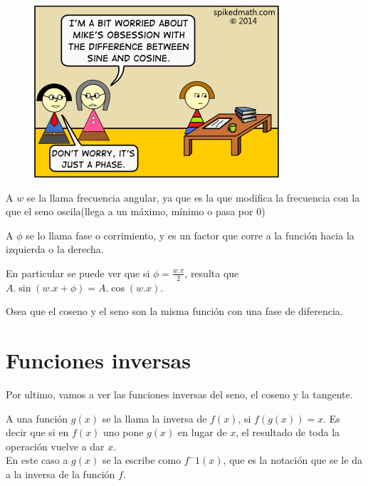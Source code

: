 \documentclass[a4paper,11pt,spanish,sans]{exam}
\begin{document}
\begin{figure}
  \begin{center}
    \includegraphics[width=\linewidth]{phase.png}
  \end{center}
\end{figure}

A $w$ se la llama frecuencia angular, ya que es la que modifica la frecuencia con la que el seno oscila(llega a un máximo, mínimo o pasa por $0$)

A $\phi$ se lo llama fase o corrimiento, y es un factor que corre a la función hacia la izquierda o la derecha.

En particular se puede ver que si $\phi=\frac{w.\pi}{2}$, resulta que $A.\sin (w.x + \phi)=A.\cos(w.x)$.

Osea que el coseno y el seno son la misma función con una fase de diferencia.




\section{Funciones inversas}

Por ultimo, vamos a ver las funciones inversas del seno, el coseno y la tangente.

A una función $g(x)$ se la llama la inversa de $f(x)$, si $f(g(x))=x$. Es decir que si en $f(x)$ uno pone $g(x)$ en lugar de $x$, el resultado de toda la operación vuelve a dar $x$. \\

En este caso a $g(x)$ se la escribe como $f^-1(x)$, que es la notación que se le da a la inversa de la función $f$.\\
\end{document}
